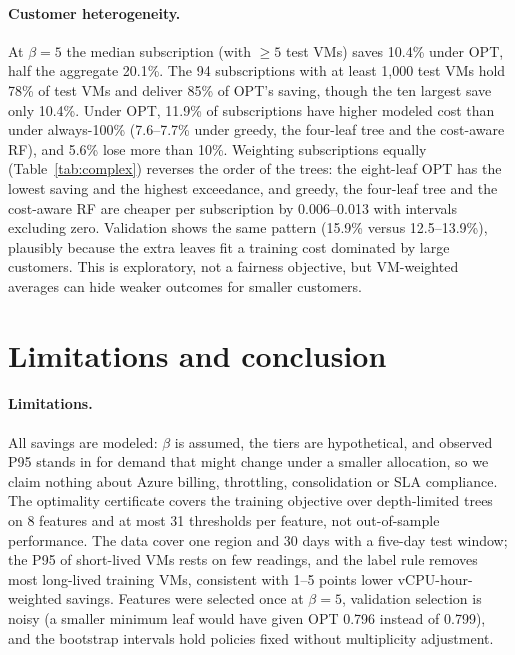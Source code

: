 \documentclass[10pt]{article}
\begin{document}
\paragraph{Customer heterogeneity.} At $\beta=5$ the median subscription (with $\ge5$ test VMs) saves 10.4\% under OPT, half the aggregate 20.1\%. The 94 subscriptions with at least 1,000 test VMs hold 78\% of test VMs and deliver 85\% of OPT's saving, though the ten largest save only 10.4\%. Under OPT, 11.9\% of subscriptions have higher modeled cost than under always-100\% (7.6--7.7\% under greedy, the four-leaf tree and the cost-aware RF), and 5.6\% lose more than 10\%. Weighting subscriptions equally (Table~\ref{tab:complex}) reverses the order of the trees: the eight-leaf OPT has the lowest saving and the highest exceedance, and greedy, the four-leaf tree and the cost-aware RF are cheaper per subscription by 0.006--0.013 with intervals excluding zero. Validation shows the same pattern (15.9\% versus 12.5--13.9\%), plausibly because the extra leaves fit a training cost dominated by large customers. This is exploratory, not a fairness objective, but VM-weighted averages can hide weaker outcomes for smaller customers.

\section{Limitations and conclusion}
\label{sec:conclusion}

\paragraph{Limitations.} All savings are modeled: $\beta$ is assumed, the tiers are hypothetical, and observed P95 stands in for demand that might change under a smaller allocation, so we claim nothing about Azure billing, throttling, consolidation or SLA compliance. The optimality certificate covers the training objective over depth-limited trees on 8 features and at most 31 thresholds per feature, not out-of-sample performance. The data cover one region and 30 days with a five-day test window; the P95 of short-lived VMs rests on few readings, and the label rule removes most long-lived training VMs, consistent with 1--5 points lower vCPU-hour-weighted savings. Features were selected once at $\beta=5$, validation selection is noisy (a smaller minimum leaf would have given OPT 0.796 instead of 0.799), and the bootstrap intervals hold policies fixed without multiplicity adjustment.
\end{document}
